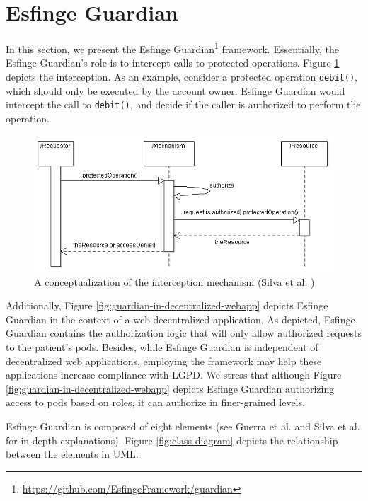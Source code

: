 \documentclass[sigconf]{acmart}
\begin{document}
\section{Esfinge Guardian}

In this section, we present the Esfinge Guardian\footnote{\url{https://github.com/EsfingeFramework/guardian}} framework. Essentially, the Esfinge Guardian's role is to intercept calls to protected operations. Figure \ref{fig:interception-mechanism} depicts the interception. As an example, consider a protected operation \verb|debit()|, which should only be executed by the account owner. Esfinge Guardian would intercept the call to \verb|debit()|, and decide if the caller is authorized to perform the operation.

\begin{figure}
 \centering
 \includegraphics[scale=0.5]{img/interception-mechanism.png}
 \caption{A conceptualization of the interception mechanism (Silva et al. \cite{Silva2013})}
 \label{fig:interception-mechanism}
\end{figure}

Additionally, Figure \ref{fig:guardian-in-decentralized-webapp} depicts Esfinge Guardian in the context of a web decentralized application. As depicted, Esfinge Guardian contains the authorization logic that will only allow authorized requests to the patient's pods. Besides, while Esfinge Guardian is independent of decentralized web applications, employing the framework may help these applications increase compliance with LGPD. We stress that although Figure \ref{fig:guardian-in-decentralized-webapp} depicts Esfinge Guardian authorizing access to pods based on roles, it can authorize in finer-grained levels.

Esfinge Guardian is composed of eight elements (see Guerra et al. \cite{Guerra2015} and Silva et al.\cite{Silva2013} for in-depth explanations). Figure \ref{fig:class-diagram} depicts the relationship between the elements in UML.
\end{document}
